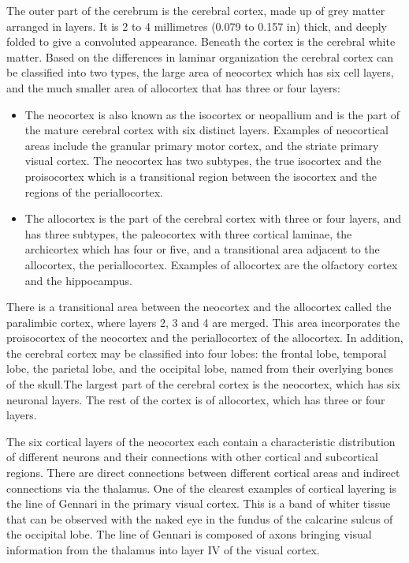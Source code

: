 \documentclass[]{book}
\providecommand{\tightlist}{%
  \setlength{\itemsep}{0pt}\setlength{\parskip}{0pt}}
\begin{document}
The outer part of the cerebrum is the cerebral cortex, made up of grey matter arranged in layers. It is 2 to 4 millimetres (0.079 to 0.157 in) thick, and deeply folded to give a convoluted appearance. Beneath the cortex is the cerebral white matter. Based on the differences in laminar organization the cerebral cortex can be classified into two types, the large area of neocortex which has six cell layers, and the much smaller area of allocortex that has three or four layers:

\begin{itemize}
\tightlist
\item
  The neocortex is also known as the isocortex or neopallium and is the part of the mature cerebral cortex with six distinct layers. Examples of neocortical areas include the granular primary motor cortex, and the striate primary visual cortex. The neocortex has two subtypes, the true isocortex and the proisocortex which is a transitional region between the isocortex and the regions of the periallocortex.
\item
  The allocortex is the part of the cerebral cortex with three or four layers, and has three subtypes, the paleocortex with three cortical laminae, the archicortex which has four or five, and a transitional area adjacent to the allocortex, the periallocortex. Examples of allocortex are the olfactory cortex and the hippocampus.
\end{itemize}

There is a transitional area between the neocortex and the allocortex called the paralimbic cortex, where layers 2, 3 and 4 are merged. This area incorporates the proisocortex of the neocortex and the periallocortex of the allocortex. In addition, the cerebral cortex may be classified into four lobes: the frontal lobe, temporal lobe, the parietal lobe, and the occipital lobe, named from their overlying bones of the skull.The largest part of the cerebral cortex is the neocortex, which has six neuronal layers. The rest of the cortex is of allocortex, which has three or four layers.

The six cortical layers of the neocortex each contain a characteristic distribution of different neurons and their connections with other cortical and subcortical regions. There are direct connections between different cortical areas and indirect connections via the thalamus. One of the clearest examples of cortical layering is the line of Gennari in the primary visual cortex. This is a band of whiter tissue that can be observed with the naked eye in the fundus of the calcarine sulcus of the occipital lobe. The line of Gennari is composed of axons bringing visual information from the thalamus into layer IV of the visual cortex.
\end{document}
